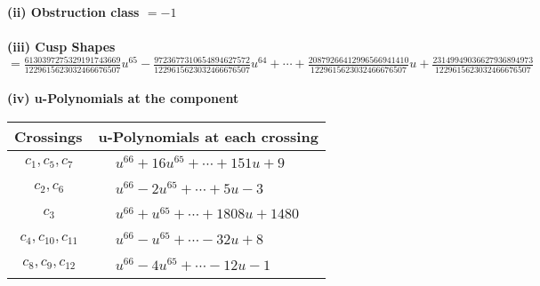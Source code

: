 \documentclass[1p]{elsarticle_modified}
\theoremstyle{definition}
\begin{document}
\flushleft \textbf{(ii) Obstruction class $= -1$}\\~\\
\flushleft \textbf{(iii) Cusp Shapes $= \frac{6130397275329191743669}{1229615623032466676507} u^{65}-\frac{9723677310654894627572}{1229615623032466676507} u^{64}+\cdots+\frac{20879266412996566941410}{1229615623032466676507} u+\frac{23149949036627936894973}{1229615623032466676507}$}\\~\\
\newpage\renewcommand{\arraystretch}{1}
\flushleft \textbf{(iv) u-Polynomials at the component}\newline \\
\begin{tabular}{m{50pt}|m{274pt}}
Crossings & \hspace{64pt}u-Polynomials at each crossing \\
\hline $$\begin{aligned}c_{1},c_{5},c_{7}\end{aligned}$$&$\begin{aligned}
&u^{66}+16 u^{65}+\cdots+151 u+9
\end{aligned}$\\
\hline $$\begin{aligned}c_{2},c_{6}\end{aligned}$$&$\begin{aligned}
&u^{66}-2 u^{65}+\cdots+5 u-3
\end{aligned}$\\
\hline $$\begin{aligned}c_{3}\end{aligned}$$&$\begin{aligned}
&u^{66}+u^{65}+\cdots+1808 u+1480
\end{aligned}$\\
\hline $$\begin{aligned}c_{4},c_{10},c_{11}\end{aligned}$$&$\begin{aligned}
&u^{66}- u^{65}+\cdots-32 u+8
\end{aligned}$\\
\hline $$\begin{aligned}c_{8},c_{9},c_{12}\end{aligned}$$&$\begin{aligned}
&u^{66}-4 u^{65}+\cdots-12 u-1
\end{aligned}$\\
\hline
\end{tabular}\\~\\
\end{document}

